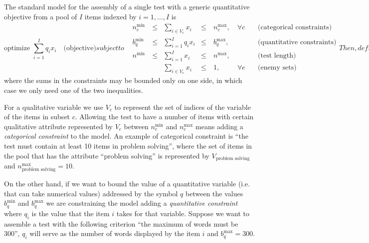 The standard model for the assembly of a single test with a generic quantitative objective from a pool of $I$ items indexed by $i=1,\ldots,I$ is
\begin{subequations}
	
	\begin{equation}\label{eq:Sobj}
	\mbox{optimize } {\sum_{i=1}^I q_i x_{i}} \quad \mbox{(objective)}
	\end{equation}
	subject to	
	\begin{alignat}{4}
	\label{eq:Scat}
	&n^{\min}_{c} \ &\le & \sum_{i \in V_c} x_i &\le \ & n^{\max}_{c},  \ & \forall c \quad & \mbox{(categorical constraints)}\\
	\label{eq:Squan}
	&b^{\min}_{q} \ &\le & \sum_{i=1}^I q_i x_i &\le \ & b^{\max}_{q},  \ & 			 \quad & \mbox{(quantitative constraints)}\\
	\label{eq:Slen}
	&n^{\min} 	  \ &\leq & \sum_{i=1}^I x_i    &\le \ & n^{\max}, 	  \ &			 \quad & \mbox{(test length)}\\
	\label{eq:Sene}
	&             \ &    & \sum_{i \in V_e} x_i&\le \ & 1, 			  \ & \forall e \quad & \mbox{(enemy sets)}
	\end{alignat}
	
	Then, definition of variables
	\begin{equation*}\label{eq:SDV2}
	x_i \in \{0,1\}, \ \forall i \quad \mbox{(decision variables)}
	\end{equation*}
	\label{eq:Smod}
\end{subequations}
where the sums in the constraints may be bounded only on one side, in which case we only need one of the two inequalities.

For a qualitative variable we use $V_c$ to represent the set of indices of the variable of the items in subset $c$. Allowing the test to have a number of items with certain qualitative attribute represented by $V_c$ between $n^{\min}_{c}$ and $n^{\max}_{c}$ means adding a \textit{categorical constraint} to the model. An example of categorical constraint is ``the test must contain at least 10 items in problem solving'', where the set of items in the pool that has the attribute ``problem solving'' is represented by $V_\text{problem solving}$ and $n^{\max}_\text{problem solving}=10$.

On the other hand, if we want to bound the value of a quantitative variable (i.e. that can take numerical values) addressed by the symbol $q$ between the values $b^{\min}_{q}$ and 	$b^{\max}_{q}$ we are constraining the model adding a \textit{quantitative constraint} where $q_i$ is the value that the item $i$ takes for that variable. Suppose we want to assemble a test with the following criterion ``the maximum of words must be 300'', $q_i$ will serve as the number of words displayed by the item $i$ and $b^{\max}_{q}=300$.


